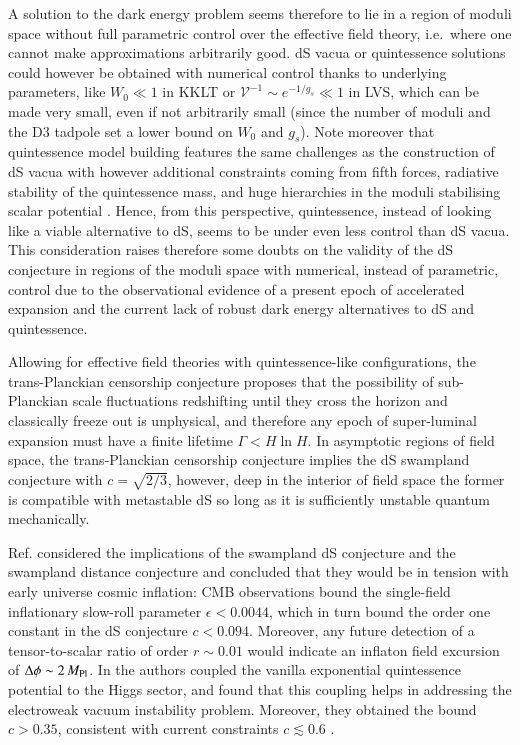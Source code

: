 A solution to the dark energy problem seems therefore to lie in a region of moduli space without full parametric control over the effective field theory, i.e.~where one cannot make approximations arbitrarily good. dS vacua or quintessence solutions could however be obtained with numerical control thanks to underlying parameters, like $W_0\ll 1$ in KKLT or $\mathcal{V}^{-1}\sim e^{-1/g_s}\ll 1$ in LVS, which can be made very small, even if not arbitrarily small (since the number of moduli and the D3 tadpole set a lower bound on $W_0$ and $g_s$). Note moreover that quintessence model building features the same challenges as the construction of dS vacua with however additional constraints coming from fifth forces, radiative stability of the quintessence mass, and huge hierarchies in the moduli stabilising scalar potential \cite{Cicoli:2021skd}. Hence, from this perspective, quintessence, instead of looking like a viable alternative to dS, seems to be under even less control than dS vacua. This consideration raises therefore some doubts on the validity of the dS conjecture in regions of the moduli space with numerical, instead of parametric, control due to the observational evidence of a present epoch of accelerated expansion and the current lack of robust dark energy alternatives to dS and quintessence.

Allowing for effective field theories with quintessence-like configurations, the trans-Planckian censorship conjecture \cite{Bedroya:2019snp} proposes that the possibility of sub-Planckian scale fluctuations redshifting until they cross the horizon and classically freeze out is unphysical, and therefore any epoch of super-luminal expansion must have a finite lifetime $\Gamma < H \ln H$. In asymptotic regions of field space, the trans-Planckian censorship conjecture implies the dS swampland conjecture with $c = \sqrt{2/3}$, however, deep in the interior of field space the former is compatible with metastable dS so long as it is sufficiently unstable quantum mechanically.

Ref. \cite{Agrawal:2018own} considered the implications of the swampland dS conjecture and the swampland distance conjecture and concluded that they would be in tension with early universe cosmic inflation: CMB observations bound the single-field inflationary slow-roll parameter $\epsilon < 0.0044$, which in turn bound the order one constant in the dS conjecture $c<0.094$. Moreover, any future detection of a tensor-to-scalar ratio of order $r \sim 0.01$ would indicate an inflaton field excursion of $\Delta \phi \sim 2\,M_{\rm Pl}$. 
In \cite{Han:2018yrk}  the authors coupled the vanilla exponential quintessence potential to the Higgs sector, and found that this coupling helps in addressing the electroweak vacuum instability problem. Moreover, they obtained the bound  $c>0.35$, consistent with current constraints $c\lesssim 0.6$ \cite{Agrawal:2018own,Akrami:2018ylq,Heisenberg:2018yae}.



